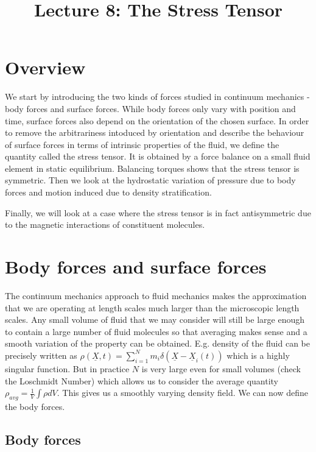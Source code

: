 \documentclass[11pt, letterpaper]{article}
\title{Lecture 8: The Stress Tensor}
\author{}
\newcommand{\1}{\textbf{1}}
\newcommand{\vect}[1]{\underline{#1}} %
\begin{document}
\maketitle

\section*{Overview}

We start by introducing the two kinds of forces studied in continuum mechanics - body forces and surface forces. While body forces only vary with position and time, surface forces also depend on the orientation of the chosen surface. In order to remove the arbitrariness intoduced by orientation and describe the behaviour of surface forces in terms of intrinsic properties of the fluid, we define the quantity called the stress tensor. It is obtained by a force balance on a small fluid element in static equilibrium. Balancing torques shows that the stress tensor is symmetric. Then we look at the hydrostatic variation of pressure due to body forces and motion induced due to density stratification. 

Finally, we will look at a case where the stress tensor is in fact antisymmetric due to the magnetic interactions of constituent molecules.

\section{Body forces and surface forces}
The continuum mechanics approach to fluid mechanics makes the approximation that we are operating at length scales much larger than the microscopic length scales. Any small volume of fluid that we may consider will still be large enough to contain a large number of fluid molecules so that averaging makes sense and a smooth variation of the property can be obtained. E.g. density of the fluid can be precisely written as $\rho(\vect X, t)=\sum_{i=1}^N m_i \delta(\vect X -\vect X_i(t))$ which is a highly singular function. But in practice $N$ is very large even for small volumes (check the Loschmidt Number) which allows us to consider the average quantity $\rho_{avg}=\frac{1}{V}\int \rho dV$. This gives us a smoothly varying density field. We can now define the body forces. 

\subsection{Body forces}
\end{document}
